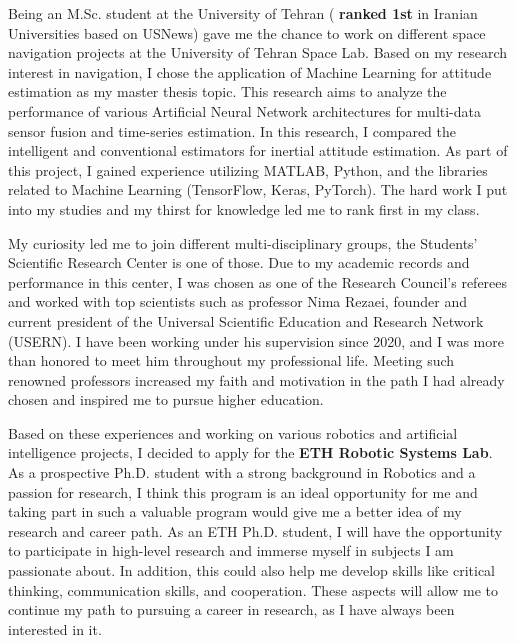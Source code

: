 \documentclass[a4,15pt]{article}
\begin{document}
\begin{large}
\quad Being an M.Sc. student at the University of Tehran ( \textbf{ranked 1st} in Iranian Universities based on USNews) gave me the chance to work on different space navigation projects at the University of Tehran Space Lab. Based on my research interest in navigation, I chose the application of Machine Learning for attitude estimation as my master thesis topic. This research aims to analyze the performance of various Artificial Neural Network architectures for multi-data sensor fusion and time-series estimation. In this research, I compared the intelligent and conventional estimators for inertial attitude estimation. As part of this project, I gained experience utilizing MATLAB, Python, and the libraries related to Machine Learning (TensorFlow, Keras, PyTorch). The hard work I put into my studies and my thirst for knowledge led me to rank first in my class.  \par
\vspace{1cm}
\quad My curiosity led me to join different multi-disciplinary groups, the Students' Scientific Research Center is one of those. Due to my academic records and performance in this center, I was chosen as one of the Research Council's referees and worked with top scientists such as professor Nima Rezaei, founder and current president of the Universal Scientific Education and Research Network (USERN). I have been working under his supervision since 2020, and I was more than honored to meet him throughout my professional life. Meeting such renowned professors increased my faith and motivation in the path I had already chosen and inspired me to pursue higher education. \par

\quad Based on these experiences and working on various robotics and artificial intelligence projects, I decided to apply for the  \textbf{ETH Robotic Systems Lab}. As a prospective Ph.D. student with a strong background in Robotics and a passion for research, I think this program is an ideal opportunity for me and taking part in such a valuable program would give me a better idea of my research and career path. As an ETH Ph.D. student, I will have the opportunity to participate in high-level research and immerse myself in subjects I am passionate about. In addition, this could also help me develop skills like critical thinking, communication skills, and cooperation. These aspects will allow me to continue my path to pursuing a career in research, as I have always been interested in it.  \par


\end{large}
\end{document}
